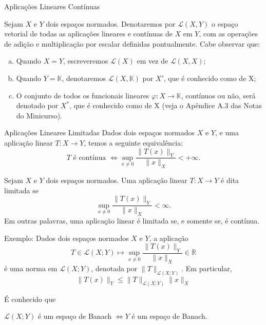 \begin{frame}{Aplicações Lineares Contínuas}
\begin{defin}
     Sejam $X$ e $Y$ dois espaços normados. Denotaremos por $\mathcal L (X,Y)$ o espaço vetorial de todas as {\color{blue} aplicações lineares e contínuas} de $X$ em $Y$, com as operações de adição e multiplicação por escalar definidas pontualmente. Cabe observar que:
    \begin{enumerate}[(a)]
    \item Quando $X=Y$, escreveremos {\color{red} $\mathcal L (X)$} em vez de $\mathcal L (X,X)$;
    \item Quando $Y=\mathbb K$, denotaremos $\mathcal L (X,\mathbb K)$ por {\color{red} $X'$}, que é conhecido como   de X;
    \item O conjunto de todos os funcionais lineares $\varphi : X\longrightarrow \mathbb K$, contínuos ou não, será denotado por {\color{red} $X^{\ast}$}, que é conhecido como   de X {\color{red} (veja o Apêndice A.3 das Notas do Minicurso).}
    \end{enumerate}
\end{defin}
\end{frame}
\begin{frame}{Aplicações Lineares Limitadas}
Dados dois espaços normados $X$ e $Y$, e uma aplicação linear $T:X\longrightarrow Y$, temos a seguinte equivalência:
{\color{red}
\[
\displaystyle T \text{ é contínua } \Longleftrightarrow \sup_{x\neq 0} \frac{\|T(x)\|_Y}{\|x\|_X} <+\infty.
\]
}
\begin{defin}
    Sejam $X$ e $Y$ dois espaços normados. Uma aplicação linear $T:X \longrightarrow Y$ é dita {\color{blue} limitada} 
se 
\begin{equation}\label{ltdo}
\sup_{x\neq 0} \frac{\|T(x)\|_Y}{\|x\|_X} 
<\infty.
\end{equation}
Em outras palavras, {\color{red} uma aplicação linear é limitada se, e somente se, é contínua.}
\end{defin}

\end{frame}
\begin{frame}{Exemplo:}
Dados dois espaços normados $X$ e $Y$, a aplicação
\[
\displaystyle T\in \mathcal L (X;Y) \longmapsto \sup_{x\neq 0} \frac{\|T(x)\|_Y}{\|x\|_X} \in \mathbb R
\]
é uma {\color{red} norma em $\mathcal L (X;Y)$}, denotada por $\|T\|_{\mathcal{L}(X;Y)}$. Em particular, 
\[\|T(x)\|_Y\leq \|T\|_{\mathcal{L}(X;Y)} \|x\|_X\]



É conhecido que
\begin{center}
\begin{minipage}{0.7\textwidth}
\begin{block}{}
{\color{blue}$\mathcal{L} (X;Y)$ {é um espaço de Banach} $\Longleftrightarrow Y$ {é um espaço de Banach}.}
\end{block}
\end{minipage}
\end{center}
\end{frame}
